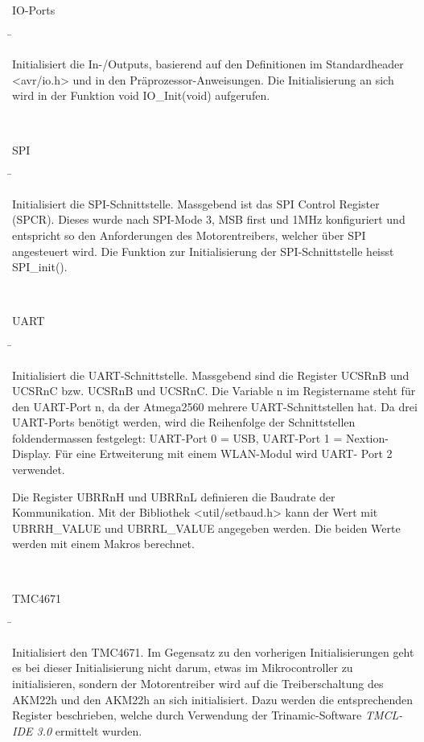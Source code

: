 \begin{tabbing}

\parbox[t]{.3\textwidth}{

IO-Ports

} \=\parbox[t]{.7\textwidth}{

Initialisiert die In-/Outputs, basierend auf den Definitionen im Standardheader <avr/io.h> und in den Präprozessor-Anweisungen. Die Initialisierung an sich wird in der Funktion void IO\_Init(void) aufgerufen.\\

}\\

\parbox[t]{.3\textwidth}{

SPI

} \=\parbox[t]{.7\textwidth}{

Initialisiert die SPI-Schnittstelle. Massgebend ist das SPI Control Register (SPCR). Dieses wurde nach SPI-Mode 3, MSB first und 1MHz konfiguriert und entspricht so den Anforderungen des Motorentreibers, welcher über SPI angesteuert wird. Die Funktion zur Initialisierung der SPI-Schnittstelle heisst SPI\_init().\\

}\\

\parbox[t]{.3\textwidth}{

UART

} \=\parbox[t]{.7\textwidth}{

Initialisiert die UART-Schnittstelle. Massgebend sind die Register UCSRnB und UCSRnC bzw. UCSRnB und UCSRnC. Die Variable n im Registername steht für den UART-Port n, da der Atmega2560 mehrere UART-Schnittstellen hat. Da drei UART-Ports benötigt werden, wird die Reihenfolge der Schnittstellen foldendermassen festgelegt: UART-Port 0 = USB, UART-Port 1 = Nextion-Display. Für eine Ertweiterung mit einem WLAN-Modul wird UART- Port 2 verwendet.

Die Register UBRRnH und UBRRnL definieren die Baudrate der Kommunikation. Mit der Bibliothek <util/setbaud.h> kann der Wert mit UBRRH\_VALUE und UBRRL\_VALUE angegeben werden. Die beiden Werte werden mit einem Makros berechnet.\\

}\\

\parbox[t]{.3\textwidth}{

TMC4671

} \=\parbox[t]{.7\textwidth}{

Initialisiert den TMC4671. Im Gegensatz zu den vorherigen Initialisierungen  geht es bei dieser Initialisierung nicht darum, etwas im Mikrocontroller zu initialisieren, sondern der Motorentreiber wird auf die Treiberschaltung des AKM22h und den AKM22h an sich initialisiert. Dazu werden die entsprechenden Register beschrieben, welche durch Verwendung der Trinamic-Software \textit{TMCL-IDE 3.0} ermittelt wurden.\\

}
\end{tabbing}

